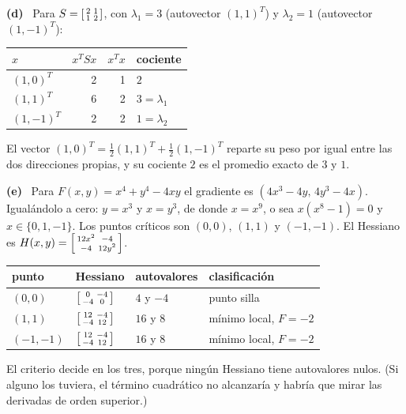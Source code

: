 \documentclass[11pt,a4paper]{article}
\newcommand{\itemsol}[1]{\par\medskip\noindent\textbf{(#1)}\ \ignorespaces}
\begin{document}
\itemsol{d} Para $S=\begin{bsmallmatrix}2&1\\1&2\end{bsmallmatrix}$, con
$\lambda_1=3$ (autovector $(1,1)^T$) y $\lambda_2=1$ (autovector $(1,-1)^T$):
\begin{center}
\begin{tabular}{@{}lrrl@{}}
\hline
$x$ & $x^TSx$ & $x^Tx$ & cociente\\
\hline
$(1,0)^T$ & 2 & 1 & $2$\\
$(1,1)^T$ & 6 & 2 & $3=\lambda_1$\\
$(1,-1)^T$ & 2 & 2 & $1=\lambda_2$\\
\hline
\end{tabular}
\end{center}
El vector $(1,0)^T=\tfrac12(1,1)^T+\tfrac12(1,-1)^T$ reparte su peso por igual
entre las dos direcciones propias, y su cociente $2$ es el promedio exacto de $3$
y $1$.

\itemsol{e} Para $F(x,y)=x^4+y^4-4xy$ el gradiente es $(4x^3-4y,\,4y^3-4x)$.
Igualándolo a cero: $y=x^3$ y $x=y^3$, de donde $x=x^9$, o sea $x(x^8-1)=0$ y
$x\in\{0,1,-1\}$. Los puntos críticos son $(0,0)$, $(1,1)$ y $(-1,-1)$. El
Hessiano es
$H(x,y)=\begin{bsmallmatrix}12x^2&-4\\-4&12y^2\end{bsmallmatrix}$.
\begin{center}
\begin{tabular}{@{}llll@{}}
\hline
punto & Hessiano & autovalores & clasificación\\
\hline
$(0,0)$ & $\begin{bsmallmatrix}0&-4\\-4&0\end{bsmallmatrix}$ & $4$ y $-4$ & punto silla\\
$(1,1)$ & $\begin{bsmallmatrix}12&-4\\-4&12\end{bsmallmatrix}$ & $16$ y $8$ & mínimo local, $F=-2$\\
$(-1,-1)$ & $\begin{bsmallmatrix}12&-4\\-4&12\end{bsmallmatrix}$ & $16$ y $8$ & mínimo local, $F=-2$\\
\hline
\end{tabular}
\end{center}
El criterio decide en los tres, porque ningún Hessiano tiene autovalores nulos.
(Si alguno los tuviera, el término cuadrático no alcanzaría y habría que mirar
las derivadas de orden superior.)
\end{document}
